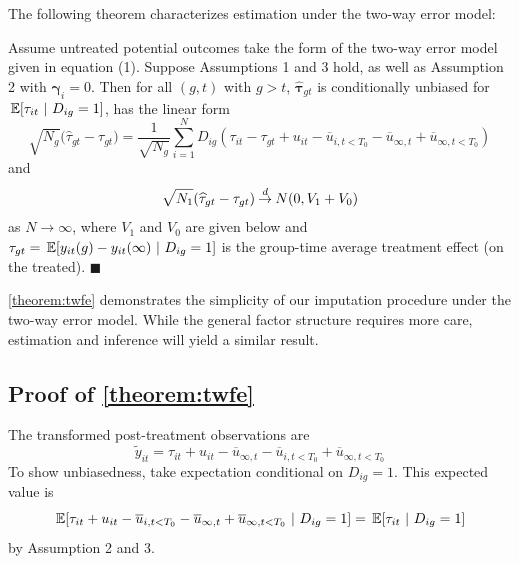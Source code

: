 \documentclass[12pt]{article}
\begin{document}
The following theorem characterizes estimation under the two-way error model:
\begin{theorem}\label{theorem:twfe}
    Assume untreated potential outcomes take the form of the two-way error model given in equation (1). Suppose Assumptions 1 and 3 hold, as well as Assumption 2 with $\bm \gamma_i = 0$. Then for all $(g, t)$ with $g > t$, $\widehat{\bm \tau}_{gt}$ is conditionally unbiased for $\E{\tau_{it}}{D_{ig} = 1}$, has the linear form
    \begin{equation}\label{eq:twfe_influence}
        \sqrt{N_{g}} \big( \widehat{\tau}_{gt} - \tau_{gt} \big) 
        = \frac{1}{\sqrt{N_{g}}}\sum_{i=1}^N D_{ig} (\tau_{it} - \tau_{gt} + u_{it} - \overline{u}_{i,t < T_0} - \overline{u}_{\infty,t} + \overline{u}_{\infty,t < T_0})
    \end{equation}
    and  
    \begin{equation}\label{eq:twfe_asymptotic}
        \sqrt{N_1}(\widehat{\tau}_{gt} - \tau_{gt}) \mathbin{\overset{d}{\to}} N(0, V_1 + V_0)
    \end{equation}
    as $N \rightarrow \infty$, where $V_1$ and $V_0$ are given below and $\tau_{gt} = \E{y_{it}(g) - y_{it}(\infty)}{D_{ig} = 1}$ is the group-time average treatment effect (on the treated). $\blacksquare$
\end{theorem}
\autoref{theorem:twfe} demonstrates the simplicity of our imputation procedure under the two-way error model. While the general factor structure requires more care, estimation and inference will yield a similar result.


\subsection*{Proof of \autoref{theorem:twfe}}

The transformed post-treatment observations are
\begin{equation}
    \tilde{y}_{it} = \tau_{it} + u_{it} - \overline{u}_{\infty,t}  - \overline{u}_{i,t < T_0} + \overline{u}_{\infty,t < T_0}
\end{equation}
To show unbiasedness, take expectation conditional on $D_{ig} = 1$. This expected value is
\begin{equation}
    \E{ \tau_{it} + u_{it} - \overline{u}_{i,t < T_0} - \overline{u}_{\infty,t} + \overline{u}_{\infty,t < T_0} }{D_{ig} = 1} = \E{\tau_{it}}{D_{ig} = 1}
\end{equation}
by Assumption 2 and 3.
\end{document}
